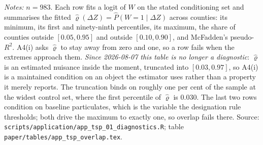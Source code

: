 \documentclass[
  12pt]{article}
\newcommand{\1}[1]{\mathds{1}\left[#1\right]}
\theoremstyle{plain}
\theoremstyle{definition}
\theoremstyle{definition}
\theoremstyle{remark}
\begin{document}
\begin{table}[!htbp]
\centering
\begin{threeparttable}
\caption{Overlap of the propensity score, condition A4(i)}
\label{tab:supp-app-overlap}
\footnotesize
\setlength{\tabcolsep}{4pt}

\begin{tablenotes}\footnotesize
\item \textit{Notes:} $n=983$. Each row fits a logit of $W$ on the stated
conditioning set and summarises the fitted
$\hat\varrho(\Delta Z)=\widehat{P}(W=1\mid\Delta Z)$ across counties: its
minimum, its first and ninety-ninth percentiles, its maximum, the share of
counties outside $[0.05,0.95]$ and outside $[0.10,0.90]$, and McFadden's
pseudo-$R^{2}$. A4(i) asks $\hat\varrho$ to stay away from zero and one, so a
row fails when the extremes approach them. \emph{Since 2026-08-07 this table is
no longer a diagnostic}: $\hat\varrho$ is an estimated nuisance inside the
moment, truncated into $[0.03,0.97]$, so A4(i) is a maintained condition on an
object the estimator uses rather than a property it merely reports. The
truncation binds on roughly one per cent of the sample at the widest control
set, where the first percentile of $\hat\varrho$ is $0.030$. The last two rows condition on baseline particulates, which is the
variable the designation rule thresholds; both drive the maximum to exactly one,
so overlap fails there. Source:
\texttt{scripts/application/app\_tsp\_01\_diagnostics.R}; table
\texttt{paper/tables/app\_tsp\_overlap.tex}.
\end{tablenotes}
\end{threeparttable}
\end{table}

\clearpage
\end{document}
